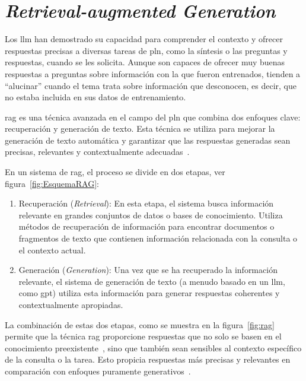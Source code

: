 \section{\textit{Retrieval-augmented Generation}}

Los \acrshort{llm} han demostrado su capacidad para comprender el contexto y ofrecer respuestas precisas a diversas tareas de \acrlong{pln}, como la síntesis o las preguntas y respuestas, cuando se les solicita. Aunque son capaces de ofrecer muy buenas respuestas a preguntas sobre información con la que fueron entrenados, tienden a ``alucinar'' cuando el tema trata sobre información que desconocen, es decir, que no estaba incluida en sus datos de entrenamiento.

\acrlong{rag} es una técnica avanzada en el campo del \acrshort{pln} que combina dos enfoques clave: recuperación y generación de texto. Esta técnica se utiliza para mejorar la generación de texto automática y garantizar que las respuestas generadas sean precisas, relevantes y contextualmente adecuadas~\cite{Lewis2020}.

En un sistema de \acrshort{rag}, el proceso se divide en dos etapas, ver figura~\ref{fig:EsquemaRAG}:

\begin{enumerate}
    \item Recuperación (\textit{Retrieval}): En esta etapa, el sistema busca información relevante en grandes conjuntos de datos o bases de conocimiento. Utiliza métodos de recuperación de información para encontrar documentos o fragmentos de texto que contienen información relacionada con la consulta o el contexto actual.

    \item Generación (\textit{Generation}): Una vez que se ha recuperado la información relevante, el sistema de generación de texto (a menudo basado en un \acrshort{llm}, como \acrshort{gpt}) utiliza esta información para generar respuestas coherentes y contextualmente apropiadas.
    
\end{enumerate}


La combinación de estas dos etapas, como se muestra en la figura~\ref{fig:rag} permite que la técnica \acrshort{rag} proporcione respuestas que no solo se basen en el conocimiento preexistente~\cite{chen-etal-2017-reading}, sino que también sean sensibles al contexto específico de la consulta o la tarea. Esto propicia respuestas más precisas y relevantes en comparación con enfoques puramente generativos~\cite{fan-etal-2019-eli5,hossain-etal-2020-simple}.

